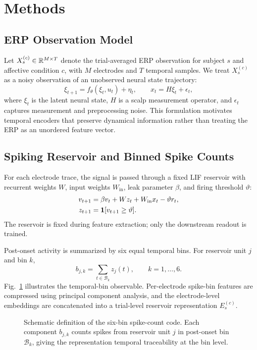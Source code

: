 \section{Methods}
\subsection{ERP Observation Model}
Let $X_s^{(c)}\in\mathbb{R}^{M\times T}$ denote the trial-averaged ERP observation for subject $s$ and affective condition $c$, with $M$ electrodes and $T$ temporal samples. We treat $X_s^{(c)}$ as a noisy observation of an unobserved neural state trajectory:
\begin{equation}
    \xi_{t+1}=f_\theta(\xi_t,u_t)+\eta_t,\qquad x_t=H\xi_t+\epsilon_t,
\end{equation}
where $\xi_t$ is the latent neural state, $H$ is a scalp measurement operator, and $\epsilon_t$ captures measurement and preprocessing noise. This formulation motivates temporal encoders that preserve dynamical information rather than treating the ERP as an unordered feature vector.

\subsection{Spiking Reservoir and Binned Spike Counts}
For each electrode trace, the signal is passed through a fixed LIF reservoir with recurrent weights $W$, input weights $W_{\mathrm{in}}$, leak parameter $\beta$, and firing threshold $\vartheta$:
\begin{align}
    v_{t+1} &= \beta v_t + W z_t + W_{\mathrm{in}}x_t - \vartheta r_t, \\
    z_{t+1} &= \mathbf{1}[v_{t+1}\geq \vartheta].
\end{align}
The reservoir is fixed during feature extraction; only the downstream readout is trained.

Post-onset activity is summarized by six equal temporal bins. For reservoir unit $j$ and bin $k$,
\begin{equation}
    b_{j,k}=\sum_{t\in\mathcal{B}_k} z_j(t),\qquad k=1,\ldots,6.
\end{equation}
Fig.~\ref{fig:bsc6} illustrates the temporal-bin observable. Per-electrode spike-bin features are compressed using principal component analysis, and the electrode-level embeddings are concatenated into a trial-level reservoir representation $E_s^{(c)}$.

\begin{figure}[t]
\centering
\resizebox{\linewidth}{!}{}
\caption{Schematic definition of the six-bin spike-count code. Each component $b_{j,k}$ counts spikes from reservoir unit $j$ in post-onset bin $\mathcal{B}_k$, giving the representation temporal traceability at the bin level.}
\label{fig:bsc6}
\end{figure}

